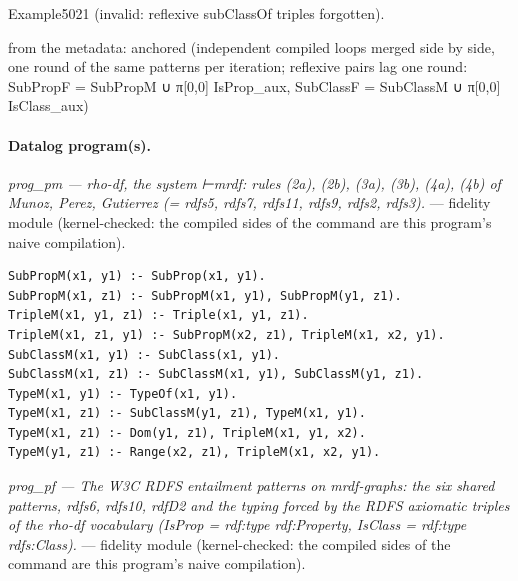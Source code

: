 \documentclass[10pt]{article}
\begin{document}
\begin{description}[leftmargin=2.6cm,style=nextline,itemsep=1pt]
\item[Twin] Example5021 (invalid: reflexive subClassOf triples forgotten).

\item[Obstruction note] from the metadata: anchored (independent compiled loops merged side by side, one round of the same patterns per iteration; reflexive pairs lag one round: SubPropF = SubPropM ∪ π[0,0] IsProp\_aux, SubClassF = SubClassM ∪ π[0,0] IsClass\_aux)

\end{description}

\paragraph{Datalog program(s).}

{\raggedright\textit{prog\_pm --- rho-df, the system ⊢mrdf: rules (2a), (2b), (3a), (3b), (4a), (4b) of Munoz, Perez, Gutierrez (= rdfs5, rdfs7, rdfs11, rdfs9, rdfs2, rdfs3).} --- fidelity module (kernel-checked: the compiled sides of the command are this program's naive compilation).\par}

\begin{Verbatim}[fontsize=\scriptsize,breaklines=true,breakanywhere=true,frame=single,framesep=1.5mm]
SubPropM(x1, y1) :- SubProp(x1, y1).
SubPropM(x1, z1) :- SubPropM(x1, y1), SubPropM(y1, z1).
TripleM(x1, y1, z1) :- Triple(x1, y1, z1).
TripleM(x1, z1, y1) :- SubPropM(x2, z1), TripleM(x1, x2, y1).
SubClassM(x1, y1) :- SubClass(x1, y1).
SubClassM(x1, z1) :- SubClassM(x1, y1), SubClassM(y1, z1).
TypeM(x1, y1) :- TypeOf(x1, y1).
TypeM(x1, z1) :- SubClassM(y1, z1), TypeM(x1, y1).
TypeM(x1, z1) :- Dom(y1, z1), TripleM(x1, y1, x2).
TypeM(y1, z1) :- Range(x2, z1), TripleM(x1, x2, y1).
\end{Verbatim}

{\raggedright\textit{prog\_pf --- The W3C RDFS entailment patterns on mrdf-graphs: the six shared patterns, rdfs6, rdfs10, rdfD2 and the typing forced by the RDFS axiomatic triples of the rho-df vocabulary (IsProp = rdf:type rdf:Property, IsClass = rdf:type rdfs:Class).} --- fidelity module (kernel-checked: the compiled sides of the command are this program's naive compilation).\par}
\end{document}
